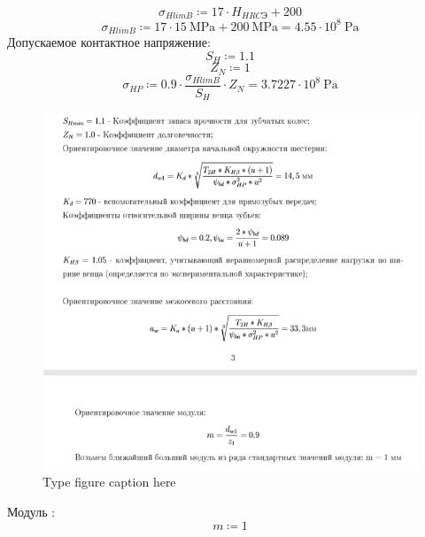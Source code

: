 \documentclass{article}
\newcommand{\defeq}{\coloneq} %
\begin{document}
\begin{equation*}
σ_{HlimB} \defeq 17 \cdot H_{HRCЭ}+200
\end{equation*}
\begin{equation*}
σ_{HlimB} \defeq 17 \cdot 15 \: \mathrm{MPa}+200 \: \mathrm{MPa} = {4.55 \cdot 10^{8} \: \mathrm{Pa}}
\end{equation*}
\colorbox[HTML]{000000}{Допускаемое контактное напряжение:}\newline
\begin{equation*}
S_{H} \defeq 1.1
\end{equation*}
\begin{equation*}
Z_{N} \defeq 1
\end{equation*}
\begin{equation*}
σ_{HP} \defeq 0.9 \cdot \frac{σ_{HlimB}}{S_{H}} \cdot Z_{N} = {3.7227 \cdot 10^{8} \: \mathrm{Pa}}
\end{equation*}
\begin{figure}[h!]
 \begin{center}
  \includegraphics[max width=\textwidth]{calculations/122.png}
  \caption{Type figure caption here}
  \label{fig:122}
 \end{center}
\end{figure}
\colorbox[HTML]{000000}{Модуль :}\newline
\begin{equation*}
m \defeq 1
\end{equation*}
\end{document}
